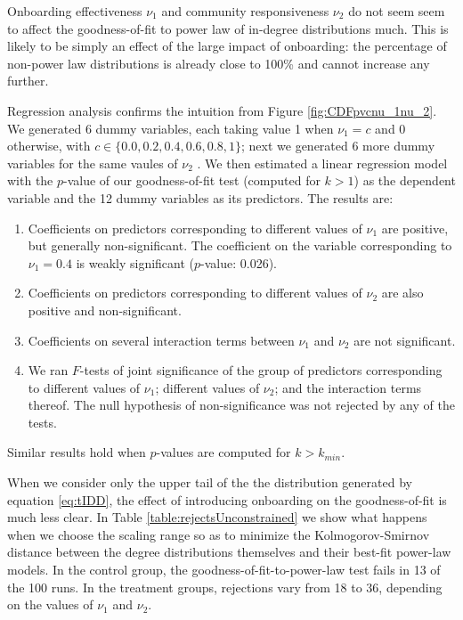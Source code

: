 \documentclass{article}
\begin{document}
Onboarding effectiveness $\nu_1$ and community responsiveness $\nu_2$ do not seem seem to affect the goodness-of-fit to power law of in-degree distributions much. This is likely to be simply an effect of the large impact of onboarding: the percentage of non-power law distributions is already close to 100\% and cannot increase any further.

Regression analysis confirms the intuition from Figure \ref{fig:CDFpvcnu_1nu_2}. We generated 6 dummy variables, each taking value 1 when $\nu_1 =  c$ and 0 otherwise, with $c \in \{0.0, 0.2, 0.4, 0.6, 0.8, 1\}$; next we generated 6 more dummy variables for the same vaules of $\nu_2$ . We then estimated a linear regression model with the $p$-value of our goodness-of-fit test (computed for $k >1$) as the dependent variable and the 12 dummy variables as its predictors. The results are:

\begin{enumerate}
\item Coefficients on predictors corresponding to different values of $\nu_1$ are positive, but generally non-significant. The coefficient on the variable corresponding to $\nu_1 = 0.4$ is weakly significant ($p$-value: 0.026).
\item Coefficients on predictors corresponding to different values of $\nu_2$ are also  positive and non-significant. 
\item Coefficients on several interaction terms between $\nu_1$ and $\nu_2$ are not significant. 
\item We ran $F$-tests of joint significance of the group of predictors corresponding to different values of $\nu_1$; different values of $\nu_2$; and the interaction terms thereof. The null hypothesis of non-significance was not rejected by any of the tests. 
\end{enumerate}

Similar results hold when $p$-values are computed for $k > k_{min}$. 

When we consider only the upper tail of the the distribution generated by equation \ref{eq:tIDD}, the effect of introducing onboarding on the goodness-of-fit is much less clear. In Table \ref{table:rejectsUnconstrained} we show what happens when we choose the scaling range so as to minimize the Kolmogorov-Smirnov distance between the degree distributions themselves and their best-fit power-law models. In the control group, the goodness-of-fit-to-power-law test fails in 13 of the 100 runs. In the treatment groups, rejections vary from 18 to 36, depending on the values of $\nu_1$ and $\nu_2$.  
\end{document}
